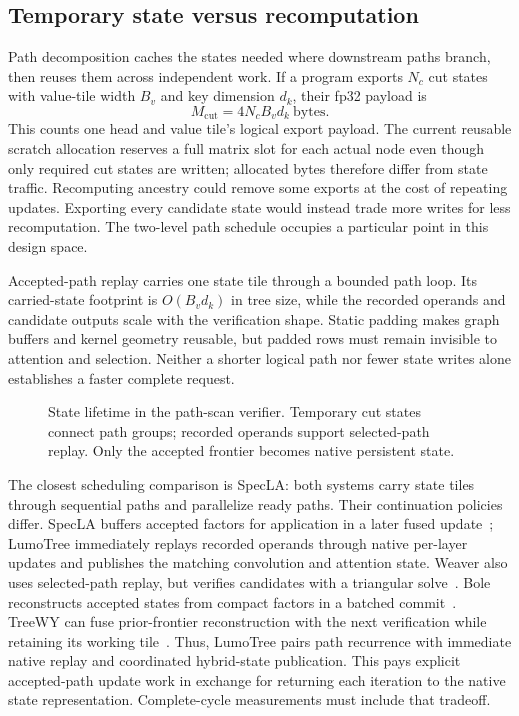 \documentclass[conference]{IEEEtran}
\newcommand{\sys}{LumoTree}
\begin{document}
\subsection{Temporary state versus recomputation}
Path decomposition caches the states needed where downstream paths branch, then reuses them across independent work. If a program exports $N_c$ cut states with value-tile width $B_v$ and key dimension $d_k$, their fp32 payload is
\begin{equation}
 M_{\mathrm{cut}}=4N_cB_vd_k\ \text{bytes}.
\end{equation}
This counts one head and value tile's logical export payload. The current reusable scratch allocation reserves a full matrix slot for each actual node even though only required cut states are written; allocated bytes therefore differ from state traffic. Recomputing ancestry could remove some exports at the cost of repeating updates. Exporting every candidate state would instead trade more writes for less recomputation. The two-level path schedule occupies a particular point in this design space.

Accepted-path replay carries one state tile through a bounded path loop. Its carried-state footprint is $O(B_vd_k)$ in tree size, while the recorded operands and candidate outputs scale with the verification shape. Static padding makes graph buffers and kernel geometry reusable, but padded rows must remain invisible to attention and selection. Neither a shorter logical path nor fewer state writes alone establishes a faster complete request.

\begin{figure}[t]
\centering

\caption{State lifetime in the path-scan verifier. Temporary cut states connect path groups; recorded operands support selected-path replay. Only the accepted frontier becomes native persistent state.}
\label{fig:scan-replay}
\end{figure}

The closest scheduling comparison is SpecLA: both systems carry state tiles through sequential paths and parallelize ready paths. Their continuation policies differ. SpecLA buffers accepted factors for application in a later fused update~\cite{wang2026specla}; \sys{} immediately replays recorded operands through native per-layer updates and publishes the matching convolution and attention state. Weaver also uses selected-path replay, but verifies candidates with a triangular solve~\cite{oda2026marginals}. Bole reconstructs accepted states from compact factors in a batched commit~\cite{wang2026bole}. TreeWY can fuse prior-frontier reconstruction with the next verification while retaining its working tile~\cite{ghantasala2026treewycode}. Thus, \sys{} pairs path recurrence with immediate native replay and coordinated hybrid-state publication. This pays explicit accepted-path update work in exchange for returning each iteration to the native state representation. Complete-cycle measurements must include that tradeoff.
\end{document}
